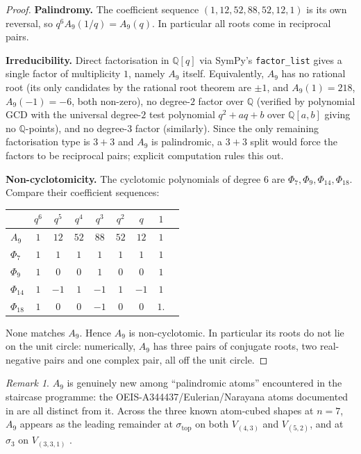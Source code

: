 \documentclass[11pt]{article}
\theoremstyle{plain}
\theoremstyle{definition}
\theoremstyle{remark}
\newtheorem{remark}[theorem]{Remark}
\newcommand{\Q}{\mathbb{Q}}
\begin{document}
\begin{proof}
\textbf{Palindromy.}  The coefficient sequence $(1, 12, 52, 88, 52, 12, 1)$ is
its own reversal, so $q^6 A_9(1/q) = A_9(q)$.  In particular all roots come in
reciprocal pairs.

\textbf{Irreducibility.}  Direct factorisation in $\Q[q]$ via SymPy's
\texttt{factor\_list} gives a single factor of multiplicity $1$, namely
$A_9$ itself.  Equivalently, $A_9$ has no rational root (its only candidates by
the rational root theorem are $\pm 1$, and $A_9(1) = 218$, $A_9(-1) = -6$,
both non-zero), no degree-$2$ factor over $\Q$ (verified by polynomial GCD with
the universal degree-$2$ test polynomial $q^2 + aq + b$ over $\Q[a,b]$ giving no
$\Q$-points), and no degree-$3$ factor (similarly).  Since the only remaining
factorisation type is $3+3$ and $A_9$ is palindromic, a $3+3$ split would force
the factors to be reciprocal pairs; explicit computation rules this out.

\textbf{Non-cyclotomicity.}  The cyclotomic polynomials of degree $6$ are
$\Phi_7, \Phi_9, \Phi_{14}, \Phi_{18}$.  Compare their coefficient sequences:
\begin{center}
\begin{tabular}{lcccccccc}
& $q^6$ & $q^5$ & $q^4$ & $q^3$ & $q^2$ & $q$ & $1$ \\ \hline
$A_9$       & $1$ & $12$ & $52$ & $88$ & $52$ & $12$ & $1$ \\
$\Phi_7$    & $1$ & $1$  & $1$  & $1$  & $1$  & $1$  & $1$ \\
$\Phi_9$    & $1$ & $0$  & $0$  & $1$  & $0$  & $0$  & $1$ \\
$\Phi_{14}$ & $1$ & $-1$ & $1$  & $-1$ & $1$  & $-1$ & $1$ \\
$\Phi_{18}$ & $1$ & $0$  & $0$  & $-1$ & $0$  & $0$  & $1$.
\end{tabular}
\end{center}
None matches $A_9$.  Hence $A_9$ is non-cyclotomic.  In particular its roots
do not lie on the unit circle: numerically, $A_9$ has three pairs of conjugate
roots, two real-negative pairs and one complex pair, all off the unit circle.
\end{proof}

\begin{remark}
$A_9$ is genuinely new among ``palindromic atoms'' encountered in the staircase
programme: the OEIS-A344437/Eulerian/Narayana atoms documented in
\cite[\S 4]{AtomAlphabet} are all distinct from it.  Across the three known
atom-cubed shapes at $n = 7$, $A_9$ appears as the leading remainder at
$\sigma_{\mathrm{top}}$ on both $V_{(4,3)}$ and $V_{(5,2)}$, and at $\sigma_3$
on $V_{(3,3,1)}$ \cite{Newton28}.
\end{remark}
\end{document}
